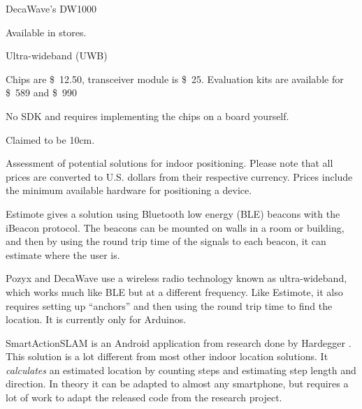 \begin{table}[!htb]
\begin{description}[style=multiline,leftmargin=2.5cm]
        \item[Product:] DecaWave's DW1000 \cite{decawave}
        \item[Availability:] Available in stores. 
        \item[Technology:] Ultra-wideband (UWB)
        \item[Price:] Chips are \SI{12.50}[\$]{}, transceiver module is \SI{25}[\$]{}. Evaluation kits are available for \SI{589}[\$]{} and \SI{990}[\$]{} 
        \item[Ease of use:] No SDK and requires implementing the chips on a board yourself. 
        \item[Accuracy:] Claimed to be 10cm. 
    \end{description}
    \caption{Assessment of potential solutions for indoor positioning. Please note that all prices are converted to U.S. dollars from their respective currency. Prices include the minimum available hardware for positioning a device.}
    \label{tbl:indoor-positioning}
\end{table}

Estimote gives a solution using Bluetooth low energy (BLE) beacons with the iBeacon protocol. 
The beacons can be mounted on walls in a room or building, 
and then by using the round trip time of the signals to each beacon, it can estimate where the user is. 

Pozyx and DecaWave use a wireless radio technology known as ultra-wideband, which works much like BLE but at a different frequency. 
Like Estimote, it also requires setting up ``anchors'' and then using the round trip time to find the location. 
It is currently only for Arduinos. 

SmartActionSLAM is an Android application from research done by Hardegger \etal \cite{SASLAM}. 
This solution is a lot different from most other indoor location solutions. 
It \emph{calculates} an estimated location by counting steps and estimating step length and direction. 
In theory it can be adapted to almost any smartphone, 
but requires a lot of work to adapt the released code from the research project. 